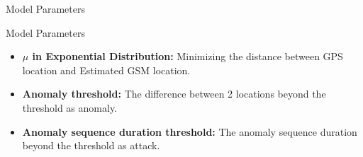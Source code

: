 \documentclass[aspectratio=169, 8pt]{beamer}
\begin{document}
\begin{frame}{Model Parameters}
\begin{block}{Model Parameters}
\begin{itemize}
    \item \textbf{$\mu$ in Exponential Distribution:} Minimizing the distance between GPS location and Estimated GSM location. \vspace{1em}
    \item \textbf{Anomaly threshold:} The difference between 2 locations beyond the threshold as anomaly. \vspace{1em}
    \item \textbf{Anomaly sequence duration threshold:} The anomaly sequence duration beyond the threshold as attack.
    \vspace{1em}
\end{itemize}

    
\end{block}

                

\end{frame}
\end{document}

